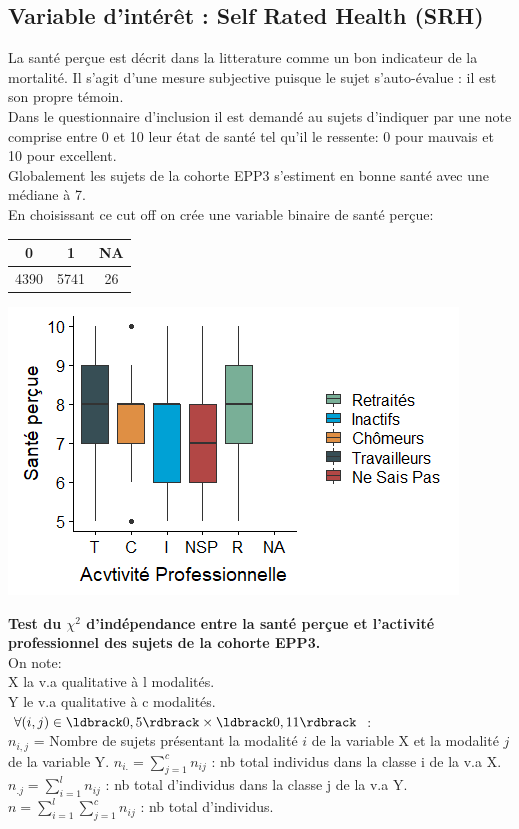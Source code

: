 \documentclass{book}
\begin{document}
\subsection{Variable d'intérêt : Self Rated Health (SRH)}
\noindent
La santé perçue est décrit dans la litterature comme un bon indicateur de la mortalité. Il s'agit d'une mesure subjective puisque le sujet s'auto-évalue : il est son propre témoin.\\
Dans le questionnaire d'inclusion il est demandé au sujets d'indiquer par une note comprise entre 0 et 10 leur état de santé tel qu'il le ressente: 0 pour mauvais et 10 pour excellent.\\


Globalement les sujets de la cohorte EPP3 s'estiment en bonne santé avec une médiane à 7.\\ En choisissant ce cut off on crée une variable binaire de santé perçue:
\begin{center}
\setlength\arrayrulewidth{.6pt}
\begin{tabular}{|c|c|c|}
\hline
  0  &  1& NA \\
  \hline
  \hline 
4390& 5741&   26\\
\hline 
\end{tabular}
\end{center}
\begin{center}
\includegraphics[scale=.5]{activpro_srh_boxplot.png}
\end{center}
\noindent
\textbf{Test du $\chi^2$ d'indépendance entre la santé perçue et l'activité professionnel des sujets de la cohorte EPP3.}\\
On note:\\
X la v.a qualitative à l modalités.\\
Y le v.a qualitative à c modalités.\\
$\forall (i,j) \in \ldbrack 0,5 \rdbrack \times \ldbrack 0,11 \rdbrack$ :\\
$n_{i,j}$ = Nombre de sujets présentant la modalité $i$ de la variable X et la modalité $j$ de la variable Y.
$n_{i.} = \sum_{j = 1} ^c n_{ij}$ : nb total individus dans la classe i de la v.a X.\\
$n_{.j} = \sum_{i = 1} ^l n_{ij}$ : nb total d'individus dans la classe j de la v.a Y.\\
$n = \sum _{i = 1} ^ l \sum_{j = 1} ^c n_{ij}$ : nb total d'individus.\\
\end{document}
